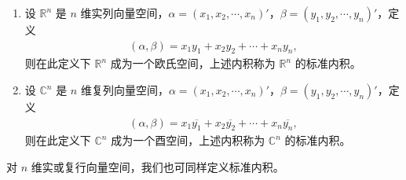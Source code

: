 \documentclass[../../main.tex]{subfiles}
\begin{document}
\begin{definition}[标准内积]
\begin{enumerate}
\item 设 \(\mathbb{R}^n\) 是 \(n\) 维实列向量空间，\(\alpha=(x_1,x_2,\cdots,x_n)'\)，\(\beta=(y_1,y_2,\cdots,y_n)'\)，定义
\begin{align*}
(\alpha,\beta)=x_1y_1 + x_2y_2+\cdots + x_ny_n,
\end{align*}
则在此定义下 \(\mathbb{R}^n\) 成为一个欧氏空间，上述内积称为 \(\mathbb{R}^n\) 的标准内积。

\item 设 \(\mathbb{C}^n\) 是 \(n\) 维复列向量空间，\(\alpha=(x_1,x_2,\cdots,x_n)'\)，\(\beta=(y_1,y_2,\cdots,y_n)'\)，定义
\begin{align*}
(\alpha,\beta)=x_1\overline{y_1}+x_2\overline{y_2}+\cdots + x_n\overline{y_n},
\end{align*}
则在此定义下 \(\mathbb{C}^n\) 成为一个酉空间，上述内积称为 \(\mathbb{C}^n\) 的标准内积。
\end{enumerate}
\end{definition}
\begin{remark}
对 \(n\) 维实或复行向量空间，我们也可同样定义标准内积。 
\end{remark}
\end{document}
